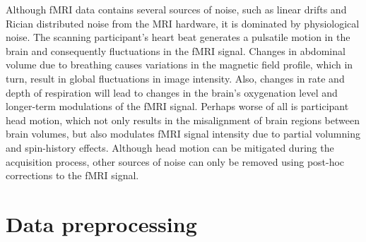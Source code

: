 Although fMRI data contains several sources of noise, such as linear drifts and Rician distributed noise from the MRI hardware\cite{Gudbjartsson1995}, it is dominated by physiological noise. The scanning participant's heart beat generates a pulsatile motion in the brain and consequently fluctuations in the fMRI signal\cite{birn2012}. Changes in abdominal volume due to breathing causes variations in the magnetic field profile, which in turn, result in global fluctuations in image intensity\cite{birn2012}. Also, changes in rate and depth of respiration will lead to changes in the brain's oxygenation level and longer-term modulations of the fMRI signal\cite{birn2012}. Perhaps worse of all is participant head motion, which not only results in the misalignment of brain regions between brain volumes, but also modulates fMRI signal intensity due to partial volumning and spin-history effects. Although head motion can be mitigated during the acquisition process, other sources of noise can only be removed using post-hoc corrections to the fMRI signal.

\section*{Data preprocessing}

